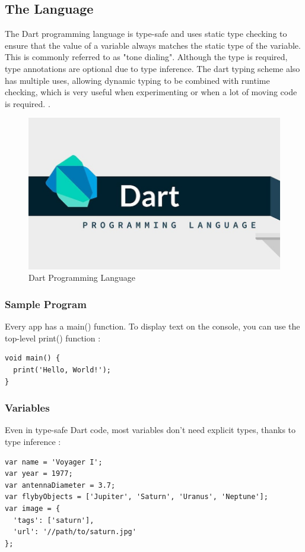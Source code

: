 \subsection{The Language}
The Dart programming language is type-safe and uses static type checking to ensure that the value of a variable always matches the static type of the variable. This is commonly referred to as "tone dialing". Although the type is required, type annotations are optional due to type inference. The dart typing scheme also has multiple uses, allowing dynamic typing to be combined with runtime checking, which is very useful when experimenting or when a lot of moving code is required. \cite{DartDev5:online}.

\begin{figure}[!htb]
    \centering
    \includegraphics[scale=0.40]{img/dartLanguage.jpg}
    \caption{Dart Programming Language}
    \label{fig:Dart Programming Language}
\end{figure}

\subsubsection{Sample Program}
Every app has a main() function. To display text on the console, you can use the top-level print() function \cite{LanguageSampleDart:online}:
\begin{verbatim}
void main() {
  print('Hello, World!');
}
\end{verbatim}

\subsubsection{Variables}
Even in type-safe Dart code, most variables don’t need explicit types, thanks to type inference \cite{LanguageSampleDart:online}:
\begin{verbatim}
var name = 'Voyager I';
var year = 1977;
var antennaDiameter = 3.7;
var flybyObjects = ['Jupiter', 'Saturn', 'Uranus', 'Neptune'];
var image = {
  'tags': ['saturn'],
  'url': '//path/to/saturn.jpg'
};
\end{verbatim}

